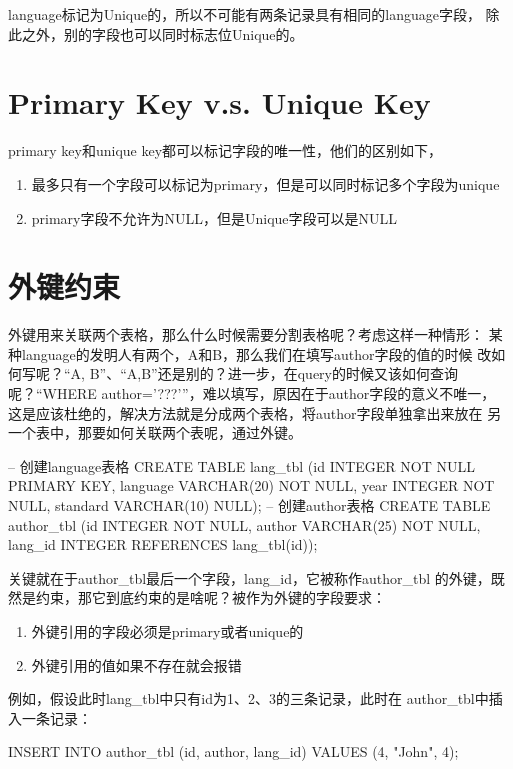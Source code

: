 \documentclass[a4paper,11pt]{article}
\begin{document}
language标记为Unique的，所以不可能有两条记录具有相同的language字段，
除此之外，别的字段也可以同时标志位Unique的。

\section[Primary Key v.s. Unique Key]{Primary Key v.s. Unique Key}
primary key和unique key都可以标记字段的唯一性，他们的区别如下，

\begin{enumerate}
\item 最多只有一个字段可以标记为primary，但是可以同时标记多个字段为unique
\item primary字段不允许为NULL，但是Unique字段可以是NULL
\end{enumerate}

\section[外键约束]{外键约束}
外键用来关联两个表格，那么什么时候需要分割表格呢？考虑这样一种情形：
某种language的发明人有两个，A和B，那么我们在填写author字段的值的时候
改如何写呢？“A, B”、“A,B”还是别的？进一步，在query的时候又该如何查询
呢？“WHERE author='???'”，难以填写，原因在于author字段的意义不唯一，
这是应该杜绝的，解决方法就是分成两个表格，将author字段单独拿出来放在
另一个表中，那要如何关联两个表呢，通过外键。

\begin{sqlcode}
-- 创建language表格
CREATE TABLE lang_tbl
(id INTEGER NOT NULL PRIMARY KEY,
 language VARCHAR(20) NOT NULL,
 year INTEGER NOT NULL,
 standard VARCHAR(10) NULL);
-- 创建author表格
CREATE TABLE author_tbl
(id INTEGER NOT NULL,
 author VARCHAR(25) NOT NULL,
 lang_id INTEGER REFERENCES lang_tbl(id));
\end{sqlcode}

关键就在于author\_tbl最后一个字段，lang\_id，它被称作author\_tbl
的外键，既然是约束，那它到底约束的是啥呢？被作为外键的字段要求：
\begin{enumerate}
\item 外键引用的字段必须是primary或者unique的
\item 外键引用的值如果不存在就会报错
\end{enumerate}
例如，假设此时lang\_tbl中只有id为1、2、3的三条记录，此时在
author\_tbl中插入一条记录：

\begin{sqlcode}
INSERT INTO author_tbl (id, author, lang_id) VALUES (4, "John", 4);
\end{sqlcode}
\end{document}
